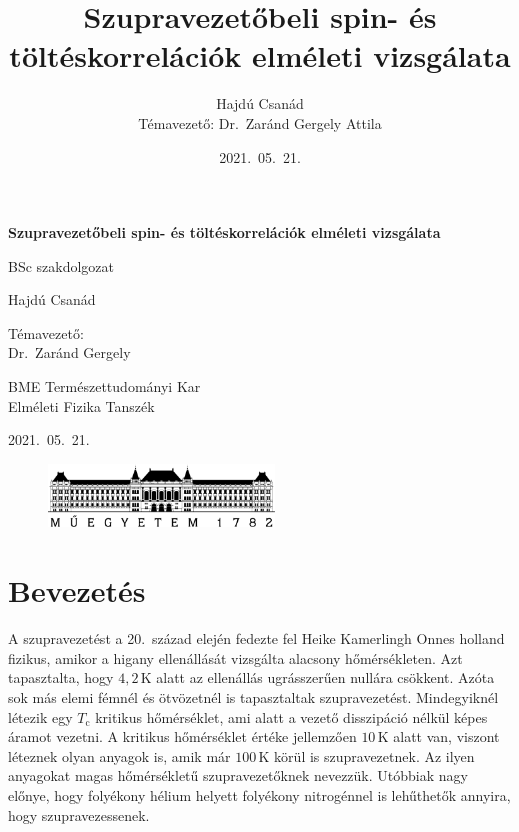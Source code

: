 \documentclass[a4paper,12pt,titlepage]{article}
\title{\bf Szupravezetőbeli spin- és töltéskorrelációk elméleti vizsgálata}
\author{Hajdú Csanád \\ \small Témavezető: Dr.\ Zaránd Gergely Attila}
\date{2021.\ 05.\ 21.}
\begin{document}
\begin{titlepage}
\begin{center}
	\vspace*{1cm}
	\textbf{\huge Szupravezetőbeli spin- és töltéskorrelációk elméleti vizsgálata}

	\vspace{1cm}

	BSc szakdolgozat

	\vspace{2.5cm}

	\Large
	Hajdú Csanád

	\vspace{2.5cm}
	{\normalsize Témavezető:} \\
	Dr.\ Zaránd Gergely

	\vfill

	BME Természettudományi Kar \\
	Elméleti Fizika Tanszék

	\vspace{1.5cm}

	2021.\ 05.\ 21.

	\begin{figure}[b]
		\centering
		\includegraphics[width=6cm]{bme-logo.png}
	\end{figure}
\end{center}
\end{titlepage}

\null
\thispagestyle{empty}
\addtocounter{page}{-1}
\newpage

\tableofcontents \newpage


\section{Bevezetés}

A szupravezetést a 20.\ század elején fedezte fel Heike Kamerlingh Onnes holland fizikus, amikor a higany ellenállását vizsgálta alacsony hőmérsékleten.  Azt tapasztalta, hogy $4,2$\,K alatt az ellenállás ugrásszerűen nullára csökkent.  Azóta sok más elemi fémnél és ötvözetnél is tapasztaltak szupravezetést.  Mindegyiknél létezik egy $T_\text{c}$ kritikus hőmérséklet, ami alatt a vezető disszipáció nélkül képes áramot vezetni.  A kritikus hőmérséklet értéke jellemzően $10$\,K alatt van, viszont léteznek olyan anyagok is, amik már $100$\,K körül is szupravezetnek.  Az ilyen anyagokat magas hőmérsékletű szupravezetőknek nevezzük.  Utóbbiak nagy előnye, hogy folyékony hélium helyett folyékony nitrogénnel is lehűthetők annyira, hogy szupravezessenek.
\end{document}
